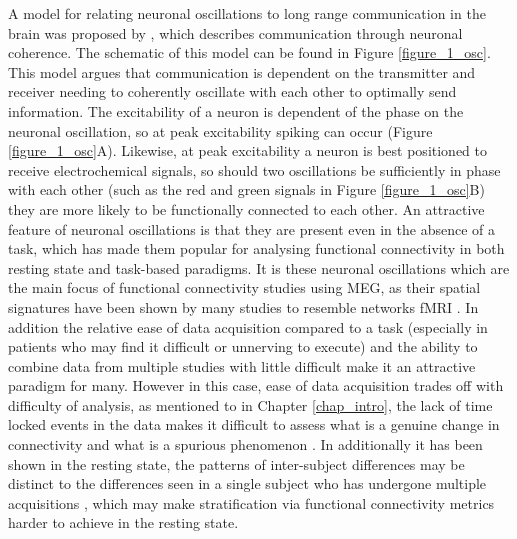 A model for relating neuronal oscillations to long range communication in the brain was proposed by \cite{Fries2005}, which describes communication through neuronal coherence. The schematic of this model can be found in Figure \ref{figure_1_osc}. This model argues that communication is dependent on the transmitter and receiver needing to coherently oscillate with each other to optimally send information. The excitability of a neuron is dependent of the phase on the neuronal oscillation, so at peak excitability spiking can occur (Figure \ref{figure_1_osc}A). Likewise, at peak excitability a neuron is best positioned to receive electrochemical signals, so should two oscillations be sufficiently in phase with each other (such as the red and green signals in Figure \ref{figure_1_osc}B) they are more likely to be functionally connected to each other. An attractive feature of neuronal oscillations is that they are present even in the absence of a task, which has made them popular for analysing functional connectivity in both resting state and task-based paradigms. It is these neuronal oscillations which are the main focus of functional connectivity studies using MEG, as their spatial signatures have been shown by many studies to resemble networks fMRI \citep{dePasquale2010,Brookes2011,Brookes2011a,Luckhoo2012,Hipp2012,Marzetti2013,Baker2014,Florin2015}. In addition the relative ease of data acquisition compared to a task (especially in patients who may find it difficult or unnerving to execute) and the ability to combine data from multiple studies with little difficult make it an attractive paradigm for many. However in this case, ease of data acquisition trades off with difficulty of analysis, as mentioned to in Chapter \ref{chap_intro}, the lack of time locked events in the data makes it difficult to assess what is a genuine change in connectivity and what is a spurious phenomenon \citep{Hindriks2016}. In additionally it has been shown in the resting state, the patterns of inter-subject differences may be distinct to the differences seen in a single subject who has undergone multiple acquisitions \citep{Laumann2015}, which may make stratification via functional connectivity metrics harder to achieve in the resting state. 

